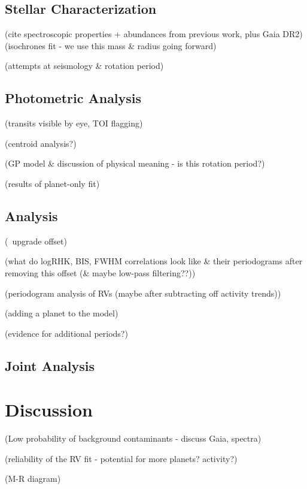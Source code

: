 \documentclass[modern]{aastex62}
\begin{document}
\subsection{Stellar Characterization}
\label{s:analysis:star}


(cite spectroscopic properties + abundances from previous work, plus Gaia DR2)
(isochrones fit - we use this mass \& radius going forward)

(attempts at seismology \& rotation period)

\subsection{Photometric Analysis}
\label{s:analysis:photometry}

(transits visible by eye, TOI flagging)

(centroid analysis?)

(GP model \& discussion of physical meaning - is this rotation period?)

(results of planet-only fit)

\subsection{\RV Analysis}
\label{s:analysis:rvs}

(\HARPS\ upgrade offset)

(what do logRHK, BIS, FWHM correlations look like \& their periodograms after removing this offset (\& maybe low-pass filtering??))

(periodogram analysis of RVs (maybe after subtracting off activity trends))

(adding a planet to the model)

(evidence for additional periods?)

\subsection{Joint Analysis}
\label{s:analysis:joint}


\section{Discussion}
\label{s:discussion}


(Low probability of background contaminants - discuss Gaia, spectra)

(reliability of the RV fit - potential for more planets? activity?)

(M-R diagram)
\end{document}
